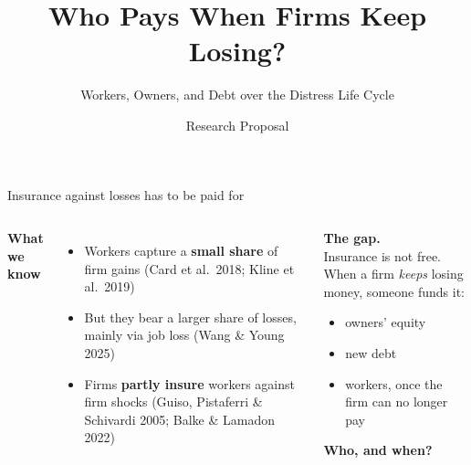 \documentclass[aspectratio=169,11pt]{beamer}
\title{Who Pays When Firms Keep Losing?}
\subtitle{Workers, Owners, and Debt over the Distress Life Cycle}
\author{Research Proposal}
\date{}
\newcommand{\hl}[1]{{\color{WarmAmber}\bfseries #1}}
\newcommand{\muted}[1]{{\color{CoolGray}#1}}
\begin{document}
\begin{frame}[plain]
  \titlepage
\end{frame}

\begin{frame}{Insurance against losses has to be paid for}
  \begin{columns}[T,onlytextwidth]
    \textbf{What we know}
    \begin{itemize}
      \item Workers capture a \hl{small share} of firm gains \muted{(Card et al.\ 2018; Kline et al.\ 2019)}
      \item But they bear a \alert{larger share} of losses, mainly via job loss \muted{(Wang \& Young 2025)}
      \item Firms \hl{partly insure} workers against firm shocks \muted{(Guiso, Pistaferri \& Schivardi 2005; Balke \& Lamadon 2022)}
    \end{itemize}

    \begin{keybox}
      \textbf{The gap.}\\[3pt]
      Insurance is not free. When a firm \emph{keeps} losing money, someone funds it:
      \begin{itemize}
        \item owners' equity
        \item new debt
        \item workers, once the firm can no longer pay
      \end{itemize}
      \vspace{2pt}
      \textbf{Who, and when?}
    \end{keybox}
  \end{columns}
\end{frame}
\end{document}
